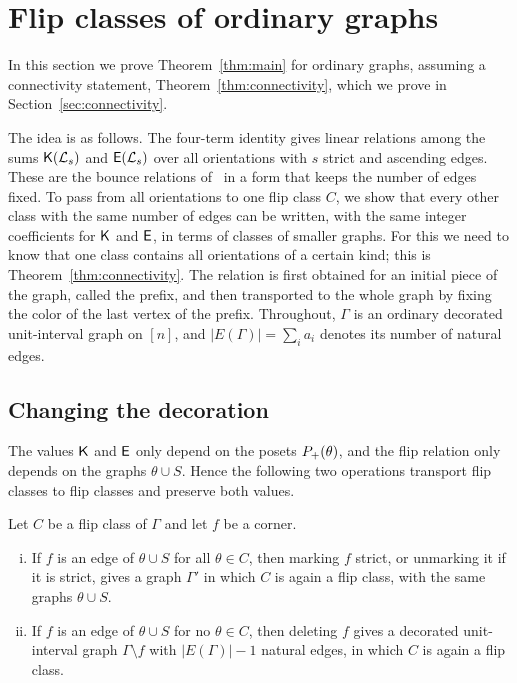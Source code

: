 \section{Flip classes of ordinary graphs}\label{sec:ordinary}

In this section we prove Theorem~\ref{thm:main} for ordinary graphs, assuming a
connectivity statement, Theorem~\ref{thm:connectivity}, which we prove in
Section~\ref{sec:connectivity}.

The idea is as follows.
The four-term identity gives linear relations among the sums $\mathsf{K}(\mathcal{L}_s)$ and
$\mathsf{E}(\mathcal{L}_s)$ over all orientations with $s$ strict and ascending edges.
These are the bounce relations of~\cite{AlexanderssonSulzgruber2022} in a form
that keeps the number of edges fixed.
To pass from all orientations to one flip class $C$, we show that every other
class with the same number of edges can be written, with the same integer coefficients for
$\mathsf{K}$ and $\mathsf{E}$, in terms of classes of smaller graphs.
For this we need to know that one class contains all orientations of a certain
kind; this is Theorem~\ref{thm:connectivity}.
The relation is first obtained for an initial piece of the graph, called the
prefix, and then transported to the whole graph by fixing the color of the last
vertex of the prefix.
Throughout, $\Gamma$ is an ordinary decorated unit-interval graph on $[n]$, and
$|E(\Gamma)|=\sum_ia_i$ denotes its number of natural edges.

\subsection{Changing the decoration}

The values $\mathsf{K}$ and $\mathsf{E}$ only depend on the posets $P_{+}(\theta)$, and the
flip relation only depends on the graphs $\theta\cup S$.
Hence the following two operations transport flip classes to flip classes and
preserve both values.

\begin{lemma}\label{lem:decoration}
Let $C$ be a flip class of $\Gamma$ and let $f$ be a corner.
\begin{enumerate}[(i)]
\item If $f$ is an edge of $\theta\cup S$ for all $\theta\in C$, then marking
$f$ strict, or unmarking it if it is strict, gives a graph $\Gamma'$ in which
$C$ is again a flip class, with the same graphs $\theta\cup S$.
\item If $f$ is an edge of $\theta\cup S$ for no $\theta\in C$, then deleting
$f$ gives a decorated unit-interval graph $\Gamma\setminus f$ with
$|E(\Gamma)|-1$ natural edges, in which $C$ is again a flip class.
\end{enumerate}
\end{lemma}

